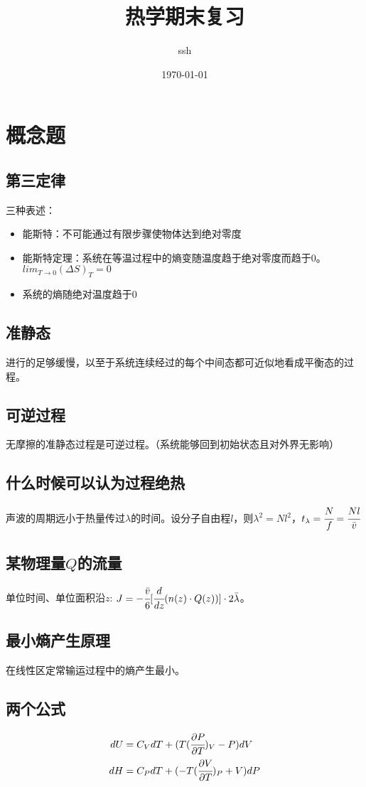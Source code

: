 \documentclass[a4paper,12pt]{article}
\title{热学期末复习}
\author{ssh}
\date{\today}
\newcommand{\myp}[3]{(\cfrac{\partial{#1}}{\partial{#2}})_{#3}}
\begin{document}
\maketitle


\section{概念题}
\subsection{第三定律}
三种表述：
\begin{itemize}
\item 能斯特：不可能通过有限步骤使物体达到绝对零度
\item 能斯特定理：系统在等温过程中的熵变随温度趋于绝对零度而趋于0。\\$lim_{T \rightarrow 0}(\Delta S)_{T} = 0$
\item 系统的熵随绝对温度趋于0
\end{itemize}

\subsection{准静态}
进行的足够缓慢，以至于系统连续经过的每个中间态都可近似地看成平衡态的过程。
\subsection{可逆过程}
无摩擦的准静态过程是可逆过程。（系统能够回到初始状态且对外界无影响）
\subsection{什么时候可以认为过程绝热}
声波的周期远小于热量传过$\lambda$的时间。设分子自由程$l$，则$\lambda^2 = N l^2$，$t_{\lambda} = \cfrac{N}{f} = \cfrac{Nl}{\bar{v}}$
\subsection{某物理量$Q$的流量}
单位时间、单位面积沿$z$: $J = - \cfrac{\bar{v}}{6} [\cfrac{d}{dz}(n(z)\cdot Q(z))] \cdot 2\bar{\lambda}$。
\subsection{最小熵产生原理}
在线性区定常输运过程中的熵产生最小。
\subsection{两个公式}
\begin{subequations}
\begin{align*}
dU &= C_V dT + (T\myp{P}{T}{V} - P)dV\\
dH &= C_P dT + (-T\myp{V}{T}{P} + V)dP
\end{align*}
\end{subequations}
\end{document}
